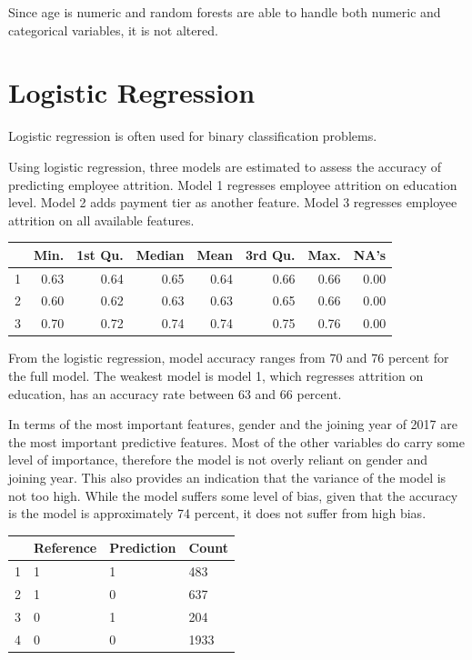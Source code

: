 \documentclass[11pt,preprint, authoryear]{elsarticle}
\let\origtable\table
\let\endorigtable\endtable
\renewenvironment{table}[1][2] {
    \expandafter\origtable\expandafter[H]
} {
    \endorigtable
}
\numberwithin{equation}{section}
\numberwithin{figure}{section}
\numberwithin{table}{section}
\begin{document}
Since age is numeric and random forests are able to handle both numeric
and categorical variables, it is not altered.

\hypertarget{logistic-regression}{%
\section*{Logistic Regression}\label{logistic-regression}}

Logistic regression is often used for binary classification problems.

Using logistic regression, three models are estimated to assess the
accuracy of predicting employee attrition. Model 1 regresses employee
attrition on education level. Model 2 adds payment tier as another
feature. Model 3 regresses employee attrition on all available features.

\begin{table}[H]
\centering
\begin{tabular}{rrrrrrrr}
  \hline
 & Min. & 1st Qu. & Median & Mean & 3rd Qu. & Max. & NA's \\ 
  \hline
1 & 0.63 & 0.64 & 0.65 & 0.64 & 0.66 & 0.66 & 0.00 \\ 
  2 & 0.60 & 0.62 & 0.63 & 0.63 & 0.65 & 0.66 & 0.00 \\ 
  3 & 0.70 & 0.72 & 0.74 & 0.74 & 0.75 & 0.76 & 0.00 \\ 
   \hline
\end{tabular}
\caption{Accuracy across logistic models \label{tab1}} 
\end{table}

From the logistic regression, model accuracy ranges from 70 and 76
percent for the full model. The weakest model is model 1, which
regresses attrition on education, has an accuracy rate between 63 and 66
percent.

In terms of the most important features, gender and the joining year of
2017 are the most important predictive features. Most of the other
variables do carry some level of importance, therefore the model is not
overly reliant on gender and joining year. This also provides an
indication that the variance of the model is not too high. While the
model suffers some level of bias, given that the accuracy is the model
is approximately 74 percent, it does not suffer from high bias.

\begin{table}[H]
\centering
\begin{tabular}{rlll}
  \hline
 & Reference & Prediction & Count \\ 
  \hline
1 & 1 & 1 &  483 \\ 
  2 & 1 & 0 &  637 \\ 
  3 & 0 & 1 &  204 \\ 
  4 & 0 & 0 & 1933 \\ 
   \hline
\end{tabular}
\caption{Confusion Matrix for Logistic Model \label{tab1}} 
\end{table}
\end{document}
